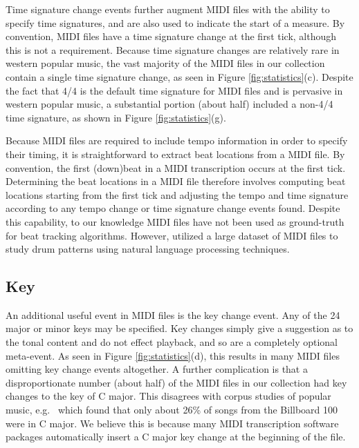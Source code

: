 \documentclass{article}
\begin{document}
Time signature change events further augment MIDI files with the ability to specify time signatures, and are also used to indicate the start of a measure.
By convention, MIDI files have a time signature change at the first tick, although this is not a requirement.
Because time signature changes are relatively rare in western popular music, the vast majority of the MIDI files in our collection contain a single time signature change, as seen in Figure \ref{fig:statistics}(c).
Despite the fact that 4/4 is the default time signature for MIDI files and is pervasive in western popular music, a substantial portion (about half) included a non-4/4 time signature, as shown in Figure \ref{fig:statistics}(g).

Because MIDI files are required to include tempo information in order to specify their timing, it is straightforward to extract beat locations from a MIDI file.
By convention, the first (down)beat in a MIDI transcription occurs at the first tick.
Determining the beat locations in a MIDI file therefore involves computing beat locations starting from the first tick and adjusting the tempo and time signature according to any tempo change or time signature change events found.
Despite this capability, to our knowledge MIDI files have not been used as ground-truth for beat tracking algorithms.
However, \cite{mauch2012corpus} utilized a large dataset of MIDI files to study drum patterns using natural language processing techniques.


\subsection{Key}
\label{sec:key}

An additional useful event in MIDI files is the key change event.
Any of the 24 major or minor keys may be specified.
Key changes simply give a suggestion as to the tonal content and do not effect playback, and so are a completely optional meta-event.
As seen in Figure \ref{fig:statistics}(d), this results in many MIDI files omitting key change events altogether.
A further complication is that a disproportionate number (about half) of the MIDI files in our collection had key changes to the key of C major.
This disagrees with corpus studies of popular music, e.g.\ \cite{carlton2012analyzed} which found that only about 26\% of songs from the Billboard 100 were in C major.
We believe this is because many MIDI transcription software packages automatically insert a C major key change at the beginning of the file.
\end{document}
